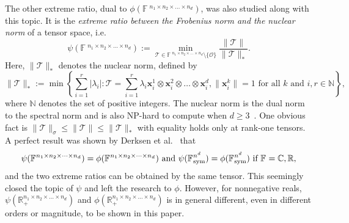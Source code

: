\documentclass[11pt]{article}
\newcommand{\C}{\mathbb{C}}
\newcommand{\R}{\mathbb{R}}
\newcommand{\N}{\mathbb{N}}
\newcommand{\BF}{\mathbb{F}\:\!}
\newcommand{\OO}{\mathcal{O}}
\newcommand{\TT}{\mathcal{T}}
\newcommand{\bx}{\boldsymbol{x}}
\newcommand{\sym}{\textnormal{sym}}
\begin{document}
The other extreme ratio, dual to $\phi(\BF^{n_1\times n_2\times \dots \times n_d})$, was also studied along with this topic. It is the {\em extreme ratio between the Frobenius norm and the nuclear norm} of a tensor space, i.e.
\begin{equation}\label{eq:ratio2}
\psi(\BF^{n_1\times n_2\times \dots \times n_d}):=\min_{\TT\in\BF^{n_1\times n_2\times \dots \times n_d}\setminus\{\OO\}}\frac{\|\TT\|}{\|\TT\|_*}.
\end{equation}
Here, $\|\TT\|_*$ denotes the nuclear norm, defined by
\begin{equation}\label{eq:nnorm}
\|\TT\|_*:=\min\left\{\sum_{i=1}^r|\lambda_i|: \TT=\sum_{i=1}^r \lambda_i \bx^1_i\otimes\bx^2_i\otimes\dots \otimes\bx^d_i, \|\bx^k_i\|=1\mbox{ for all $k$ and $i$}, r\in\N \right\},
\end{equation}
where $\N$ denotes the set of positive integers. The nuclear norm is the dual norm to the spectral norm and is also NP-hard to compute when $d\ge3$~\cite{FL18}. One obvious fact is $\|\TT\|_\sigma\le\|\TT\|\le\|\TT\|_*$ with equality holds only at rank-one tensors. A perfect result was shown by Derksen et al.~\cite{DFLW17} that
$$
\psi(\BF^{n_1\times n_2\times \dots \times n_d})=\phi(\BF^{n_1\times n_2\times \dots \times n_d}) \mbox{ and } \psi(\BF^{n^d}_\sym)= \phi(\BF^{n^d}_\sym) \mbox{ if }\BF=\C,\R,
$$
and the two extreme ratios can be obtained by the same tensor. This seemingly closed the topic of $\psi$ and left the research to $\phi$. However, for nonnegative reals, $\psi(\R_+^{n_1\times n_2\times \dots \times n_d})$ and $\phi(\R_+^{n_1\times n_2\times \dots \times n_d})$ is in general different, even in different orders or magnitude, to be shown in this paper.
\end{document}
